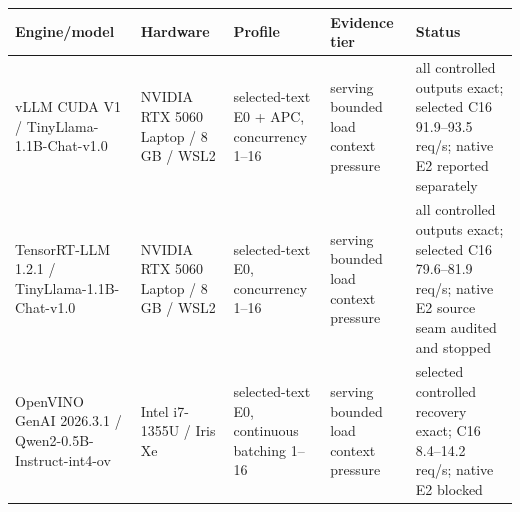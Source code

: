 \begin{tabularx}{\linewidth}{lYYYY}
\toprule
Engine/model & Hardware & Profile & Evidence tier & Status \\
\midrule
vLLM CUDA V1 / TinyLlama-1.1B-Chat-v1.0 & NVIDIA RTX 5060 Laptop / 8 GB / WSL2 & selected-text E0 + APC, concurrency 1--16 & serving bounded load context pressure & all controlled outputs exact; selected C16 91.9--93.5 req/s; native E2 reported separately \\
TensorRT-LLM 1.2.1 / TinyLlama-1.1B-Chat-v1.0 & NVIDIA RTX 5060 Laptop / 8 GB / WSL2 & selected-text E0, concurrency 1--16 & serving bounded load context pressure & all controlled outputs exact; selected C16 79.6--81.9 req/s; native E2 source seam audited and stopped \\
OpenVINO GenAI 2026.3.1 / Qwen2-0.5B-Instruct-int4-ov & Intel i7-1355U / Iris Xe & selected-text E0, continuous batching 1--16 & serving bounded load context pressure & selected controlled recovery exact; C16 8.4--14.2 req/s; native E2 blocked \\
\bottomrule
\end{tabularx}
